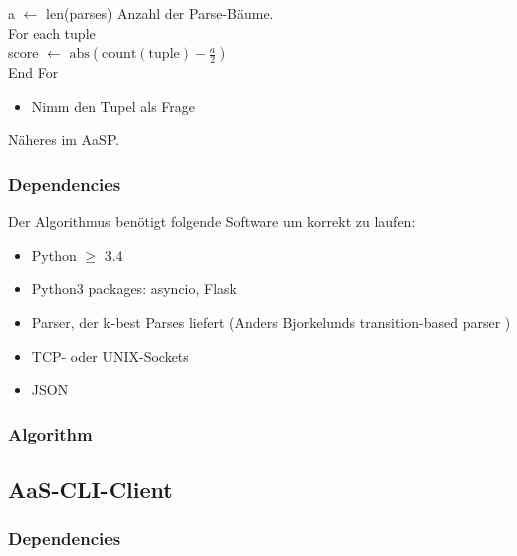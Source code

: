 \documentclass{scrartcl}
\begin{document}
        \indent\indent\indent\indent\indent\indent a $\gets$ len(parses) Anzahl der Parse-Bäume. \\
        \indent\indent\indent\indent\indent\indent For each tuple \\
       \indent\indent\indent\indent\indent\indent\indent score $\gets$ $\mathrm{abs}(\mathrm{count(tuple)} - \frac{a}{2})$ \\
        \indent\indent\indent\indent\indent\indent End For

    \begin{itemize}
        \item Nimm den Tupel als Frage
    \end{itemize}
Näheres im AaSP.

\subsubsection{Dependencies}
\label{ssub:Server-Dependencies}
Der Algorithmus benötigt folgende Software um korrekt zu laufen:
    \begin{itemize}
        \item Python $\geq$ 3.4 
        \item Python3 packages: asyncio, Flask
        \item Parser, der k-best Parses liefert (Anders Bjorkelunds transition-based parser )
        \item TCP- oder UNIX-Sockets
        \item JSON
    \end{itemize}

\subsubsection{Algorithm}
\label{ssub:Algorithm}

\subsection{AaS-CLI-Client}
\label{sub:AaS-CLI-Client}

\subsubsection{Dependencies}
\label{ssub:CLI-Client-Dependencies}
\end{document}

